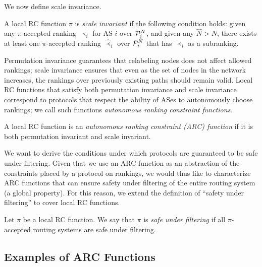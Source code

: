 We now define scale invariance.

\begin{defn}
A local RC function $\pi$ is {\em scale invariant} if the following condition
holds: given any $\pi$-accepted
ranking $\prec_i$ for AS $i$ over $\P_i^N$,
and given any $\hat{N} > N$, there exists at least 
one $\pi$-accepted ranking $\hat{\prec}_i$ over
$\P_i^{\hat{N}}$ that has $\prec_i$ as a subranking.
\end{defn}

Permutation invariance guarantees that relabeling nodes does not
affect allowed rankings; scale invariance ensures that even as
the set of nodes in the network increases, the rankings over
previously existing paths should remain valid.  Local RC functions that satisfy
both permutation invariance and scale invariance correspond to
protocols that respect the ability of ASes to autonomously choose
rankings; we call such functions {\em autonomous ranking constraint
  functions}.  

\begin{defn} 
A local RC function is an {\em autonomous ranking constraint (ARC) function}
if it is both permutation invariant and scale
invariant. 
\end{defn}

We want to derive the conditions under which protocols are guaranteed to
be safe under filtering.  Given that we use an ARC function as an
abstraction of the constraints placed by a protocol on rankings, we
would thus like to characterize ARC functions that can ensure safety
under filtering of the entire routing system (a global property).  For
this reason, we extend the definition of ``safety under filtering'' to
cover local RC functions.

\begin{defn}
Let $\pi$ be a local RC function.  We say that $\pi$ is {\em safe under
filtering} if all $\pi$-accepted routing systems are safe under
filtering.
\end{defn}


\subsection{Examples of ARC Functions}
\label{ssec:localex}

